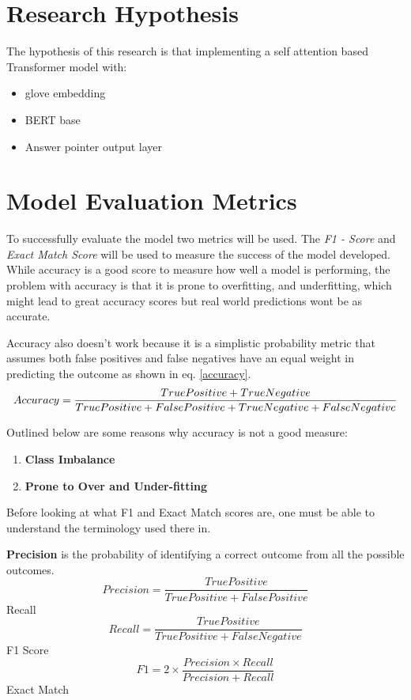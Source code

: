 \documentclass[a4paper,12pt]{report}
\begin{document}
    \section{Research Hypothesis}\label{c33}
    The hypothesis of this research is that implementing a self attention based Transformer model with:
    \begin{itemize}
    	\item glove embedding
    	\item BERT base\citep{bert}
    	\item Answer pointer output layer\citep{lstmPointer, lstmhu2016question}

    \end{itemize}
	\section{Model Evaluation Metrics}\label{33}
	
		To successfully evaluate the model two metrics will be used. The \textit{F1 - Score} and \textit{Exact Match Score} will be used to measure the success of the model developed. While accuracy is a good score to measure how well a model is performing, the problem with accuracy is that it is prone to overfitting, and underfitting, which might lead to great accuracy scores but real world predictions wont be as accurate.
		
		Accuracy also doesn't work because it is a simplistic probability metric that assumes both false positives and false negatives have an equal weight in predicting the outcome as shown in eq. \ref{accuracy}.
				\begin{equation}\label{accuracy}
			Accuracy = \small \dfrac{True Positive + True Negative}{True Positive + False Positive + True Negative + False Negative}
		\end{equation}

		Outlined below are some reasons why accuracy is not a good measure:
		\begin{enumerate}
			\item \textbf{Class Imbalance}
			\item \textbf{Prone to Over and Under-fitting}
		\end{enumerate}
	
	Before looking at what F1 and Exact Match scores are, one must be able to understand the terminology used there in. 

	\textbf{Precision} is the probability of identifying a correct outcome from all the possible outcomes. 
	\begin{equation}\label{precision}
		Precision = \dfrac{True Positive}{True Positive +  False Positive }
	\end{equation}
	Recall
		\begin{equation}\label{recall}
		Recall = \dfrac{True Positive}{True Positive +  False Negative }
	\end{equation}
	F1 Score 
		\begin{equation}\label{f1}
		F1 = 2 \times \dfrac{Precision \times Recall}{Precision + Recall}
	\end{equation}
	Exact Match
	
\end{document}
